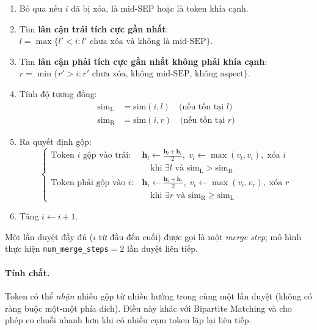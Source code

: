 \begin{enumerate}
  \item Bỏ qua nếu $i$ đã bị xóa, là mid-SEP hoặc là token khía
    cạnh.
  \item Tìm \textbf{lân cận trái tích cực gần nhất}:
    $l = \max\{l' < i : l' \text{ chưa xóa và không là mid-SEP}\}$.
  \item Tìm \textbf{lân cận phải tích cực gần nhất không phải
    khía cạnh}:
    $r = \min\{r' > i : r' \text{ chưa xóa, không mid-SEP, không
    aspect}\}$.
  \item Tính độ tương đồng:
    \begin{align}
      \mathrm{sim}_{\mathrm{L}} &=
        \mathrm{sim}(i, l) \quad \text{(nếu tồn tại } l \text{)}
        \label{eq:sim_left}\\
      \mathrm{sim}_{\mathrm{R}} &=
        \mathrm{sim}(i, r) \quad \text{(nếu tồn tại } r \text{)}
        \label{eq:sim_right}
    \end{align}
  \item Ra quyết định gộp:
    \begin{equation}
      \begin{cases}
        \text{Token } i \text{ gộp vào trái}:
          & \mathbf{h}_l \leftarrow \tfrac{\mathbf{h}_l + \mathbf{h}_i}{2},\;
            v_l \leftarrow \max(v_l, v_i),\;
            \text{xóa } i \\
            & \quad \text{khi } \exists l \text{ và }
              \mathrm{sim}_{\mathrm{L}} > \mathrm{sim}_{\mathrm{R}}\\[6pt]
        \text{Token phải gộp vào } i:
          & \mathbf{h}_i \leftarrow \tfrac{\mathbf{h}_i + \mathbf{h}_r}{2},\;
            v_i \leftarrow \max(v_i, v_r),\;
            \text{xóa } r \\
            & \quad \text{khi } \exists r \text{ và }
              \mathrm{sim}_{\mathrm{R}} \geq \mathrm{sim}_{\mathrm{L}}
      \end{cases}
      \label{eq:seq_decision}
    \end{equation}
  \item Tăng $i \leftarrow i + 1$.
\end{enumerate}

Một lần duyệt đầy đủ ($i$ từ đầu đến cuối) được gọi là một
\textit{merge step}; mô hình thực hiện \texttt{num\_merge\_steps}$= 2$
lần duyệt liên tiếp.

\paragraph{Tính chất.}
Token có thể \textit{nhận} nhiều gộp từ nhiều hướng trong cùng một
lần duyệt (không có ràng buộc một-một phía đích).  Điều này khác với
Bipartite Matching và cho phép co chuỗi nhanh hơn khi có nhiều cụm
token lặp lại liên tiếp.

